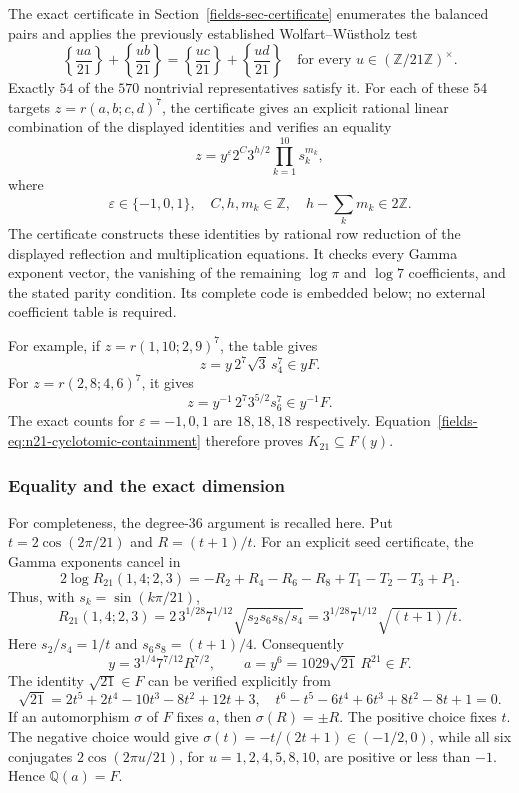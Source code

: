 \documentclass[11pt,a4paper]{article}
\theoremstyle{definition}
\theoremstyle{remark}
\numberwithin{equation}{section}
\begin{document}
The exact certificate in Section~\ref{fields-sec-certificate} enumerates the balanced pairs and applies
the previously established Wolfart--W\"ustholz test
\[
 \left\{\frac{ua}{21}\right\}+\left\{\frac{ub}{21}\right\}
 =\left\{\frac{uc}{21}\right\}+\left\{\frac{ud}{21}\right\}
 \quad\text{for every }u\in(\mathbb Z/21\mathbb Z)^\times.
\]
Exactly $54$ of the $570$ nontrivial representatives satisfy it.
For each of these $54$ targets $z=r(a,b;c,d)^7$, the certificate gives
an explicit rational linear combination of the displayed identities
and verifies an equality
\begin{equation}\label{fields-eq:n21-all-targets}
 \boxed{z=y^{\varepsilon}
  2^C3^{h/2}\prod_{k=1}^{10}s_k^{m_k},}
\end{equation}
where
\[
 \varepsilon\in\{-1,0,1\},\quad C,h,m_k\in\mathbb Z,
 \quad h-\sum_k m_k\in2\mathbb Z.
\]
The certificate constructs these identities by rational row reduction of
the displayed reflection and multiplication equations. It checks every
Gamma exponent vector, the vanishing of the remaining $\log\pi$ and
$\log7$ coefficients, and the stated parity condition. Its complete code
is embedded below; no external coefficient table is required.

For example, if $z=r(1,10;2,9)^7$, the table gives
\[
 z=y\,2^7\sqrt3\,s_4^7\in yF.
\]
For $z=r(2,8;4,6)^7$, it gives
\[
 z=y^{-1}\,2^7 3^{5/2}s_6^7\in y^{-1}F.
\]
The exact counts for $\varepsilon=-1,0,1$ are $18,18,18$ respectively.
Equation~\eqref{fields-eq:n21-cyclotomic-containment} therefore proves
$K_{21}\subseteq F(y)$.

\subsubsection{Equality and the exact dimension}
For completeness, the degree-$36$ argument is recalled here. Put
$t=2\cos(2\pi/21)$ and $R=(t+1)/t$. For an explicit seed certificate, the Gamma exponents cancel in
\[
 2\log R_{21}(1,4;2,3)
 =-R_2+R_4-R_6-R_8+T_1-T_2-T_3+P_1.
\]
Thus, with $s_k=\sin(k\pi/21)$,
\[
 R_{21}(1,4;2,3)=2\,3^{1/28}7^{1/12}
 \sqrt{s_2s_6s_8/s_4}
 =3^{1/28}7^{1/12}\sqrt{(t+1)/t}.
\]
Here $s_2/s_4=1/t$ and $s_6s_8=(t+1)/4$.
Consequently
\[
 y=3^{1/4}7^{7/12}R^{7/2},\qquad
 a=y^6=1029\sqrt{21}\,R^{21}\in F.
\]
The identity $\sqrt{21}\in F$ can be verified explicitly from
\[
 \sqrt{21}=2t^5+2t^4-10t^3-8t^2+12t+3,
 \quad t^6-t^5-6t^4+6t^3+8t^2-8t+1=0.
\]
If an automorphism $\sigma$ of $F$ fixes $a$, then
$\sigma(R)=\pm R$. The positive choice fixes $t$. The negative choice
would give $\sigma(t)=-t/(2t+1)\in(-1/2,0)$, while all six conjugates
$2\cos(2\pi u/21)$, for $u=1,2,4,5,8,10$, are positive or less
than $-1$. Hence $\mathbb Q(a)=F$.
\end{document}
